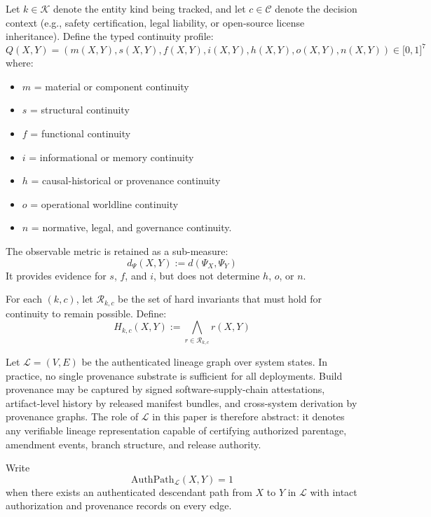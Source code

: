 \documentclass[11pt,a4paper]{article}
\begin{document}
Let \(k \in \mathcal{K}\) denote the entity kind being tracked, and let \(c \in \mathcal{C}\) denote the decision context (e.g., safety certification, legal liability, or open-source license inheritance). Define the typed continuity profile:
\begin{equation}
Q(X, Y) = (m(X, Y), s(X, Y), f(X, Y), i(X, Y), h(X, Y), o(X, Y), n(X, Y)) \in \lbrack 0, 1 \rbrack^7
\end{equation}
where:
\begin{itemize}
    \item \(m\) = material or component continuity
    \item \(s\) = structural continuity
    \item \(f\) = functional continuity
    \item \(i\) = informational or memory continuity
    \item \(h\) = causal-historical or provenance continuity
    \item \(o\) = operational worldline continuity
    \item \(n\) = normative, legal, and governance continuity.
\end{itemize}

The observable metric is retained as a sub-measure:
\begin{equation}
d_\Psi(X, Y) := d(\Psi_X, \Psi_Y)
\end{equation}
It provides evidence for \(s\), \(f\), and \(i\), but does not determine \(h\), \(o\), or \(n\).

For each \((k, c)\), let \(\mathcal{R}_{k,c}\) be the set of hard invariants that must hold for continuity to remain possible. Define:
\begin{equation}
H_{k,c}(X, Y) := \bigwedge_{r \in \mathcal{R}_{k,c}} r(X, Y)
\end{equation}

Let \(\mathcal{L} = (V, E)\) be the authenticated lineage graph over system states. In practice, no single provenance substrate is sufficient for all deployments. Build provenance may be captured by signed software-supply-chain attestations, artifact-level history by released manifest bundles, and cross-system derivation by provenance graphs. The role of \(\mathcal{L}\) in this paper is therefore abstract: it denotes any verifiable lineage representation capable of certifying authorized parentage, amendment events, branch structure, and release authority.

Write 
\[
\mathrm{AuthPath}_{\mathcal{L}}(X, Y) = 1
\]
when there exists an authenticated descendant path from \(X\) to \(Y\) in \(\mathcal{L}\) with intact authorization and provenance records on every edge.
\end{document}
